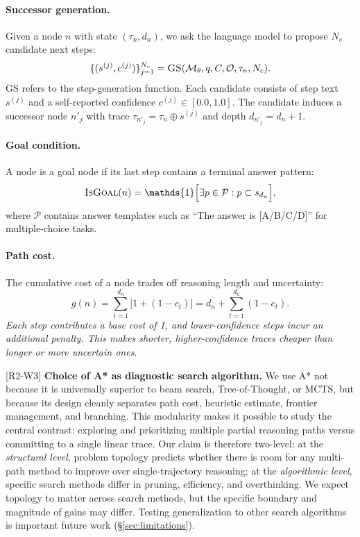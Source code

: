 \documentclass[11pt]{article}
\begin{document}
\paragraph{Successor generation.}
Given a node $n$ with state $(\tau_n, d_n)$, we ask the language model to propose $N_c$ candidate next steps:
\begin{equation}
\{(s^{(j)}, c^{(j)})\}_{j=1}^{N_c} = \textsc{GS}(\mathcal{M}_\theta, q, C, \mathcal{O}, \tau_n, N_c).
\label{eq:successor}
\end{equation}
\textsc{GS} refers to the step-generation function. Each candidate consists of step text $s^{(j)}$ and a self-reported confidence $c^{(j)} \in [0.0,1.0]$. The candidate induces a successor node $n'_j$ with trace $\tau_{n'_j} = \tau_n \oplus s^{(j)}$ and depth $d_{n'_j} = d_n + 1$.

\paragraph{Goal condition.}
A node is a goal node if its last step contains a terminal answer pattern:
\begin{equation}
\textsc{IsGoal}(n) = \mathds{1}\Big[\exists p \in \mathcal{P}: p \subset s_{d_n}\Big],
\label{eq:isgoal}
\end{equation}
where $\mathcal{P}$ contains answer templates such as ``The answer is [A/B/C/D]'' for multiple-choice tasks.

\paragraph{Path cost.}
The cumulative cost of a node trades off reasoning length and uncertainty:
\begin{equation}
g(n) = \sum_{t=1}^{d_n} \big[1 + (1-c_t)\big]
    = d_n + \sum_{t=1}^{d_n}(1-c_t).
\label{eq:gcost}
\end{equation}
\textit{Each step contributes a base cost of 1, and lower-confidence steps incur an additional penalty. This makes shorter, higher-confidence traces cheaper than longer or more uncertain ones.}

\textcolor{reviewerblue}{[R2-W3] \textbf{Choice of A* as diagnostic search algorithm.} We use A* not because it is universally superior to beam search, Tree-of-Thought, or MCTS, but because its design cleanly separates path cost, heuristic estimate, frontier management, and branching. This modularity makes it possible to study the central contrast: exploring and prioritizing multiple partial reasoning paths versus committing to a single linear trace. Our claim is therefore two-level: at the \emph{structural level}, problem topology predicts whether there is room for any multi-path method to improve over single-trajectory reasoning; at the \emph{algorithmic level}, specific search methods differ in pruning, efficiency, and overthinking. We expect topology to matter across search methods, but the specific boundary and magnitude of gains may differ. Testing generalization to other search algorithms is important future work (\S\ref{sec:limitations}).}
\end{document}
